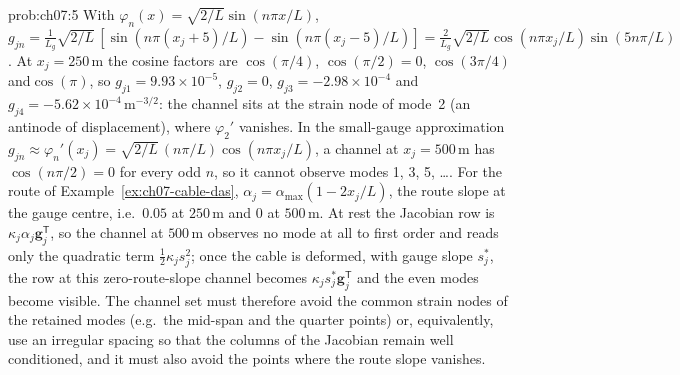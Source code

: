 \documentclass[graybox,envcountchap]{style/SNmono}
\providecommand{\DIFadd}[1]{{\protect\color{blue} #1}} %
\providecommand{\DIFaddbegin}{} %
\providecommand{\DIFaddend}{} %
\begin{document}
\begin{sol}{prob:ch07:5}
With $\varphi_n(x)=\sqrt{2/L}\sin(n\pi x/L)$, $g_{jn}=\frac{1}{L_g}\sqrt{2/L}\,[\sin(n\pi(x_j+5)/L)-\sin(n\pi(x_j-5)/L)]=\frac{2}{L_g}\sqrt{2/L}\cos(n\pi x_j/L)\sin(5n\pi/L)$. At $x_j=250$\,m the cosine factors are $\cos(\pi/4)$, $\cos(\pi/2)=0$, $\cos(3\pi/4)$ and\DIFaddbegin \allowbreak \DIFaddend $\cos(\pi)$, so $g_{j1}=9.93\times10^{-5}$, $g_{j2}=0$, $g_{j3}=-2.98\times10^{-4}$ and\DIFaddbegin \allowbreak \DIFaddend $g_{j4}=-5.62\times10^{-4}$\,m$^{-3/2}$: the channel sits at the strain node of mode~2 (an antinode of displacement), where $\varphi_2'$ vanishes. In the small-gauge approximation $g_{jn}\approx\varphi_n'(x_j)=\sqrt{2/L}\,(n\pi/L)\cos(n\pi x_j/L)$, a channel at $x_j=500$\,m has $\cos(n\pi/2)=0$ for every odd $n$, so it cannot observe modes 1, 3, 5, \ldots. For the route of Example~\ref{ex:ch07-cable-das}, $\alpha_j=\alpha_{\max}(1-2x_j/L)$, the route slope at the gauge centre, i.e.\ $0.05$ at $250$\,m and $0$ at $500$\,m. At rest the Jacobian row is $\kappa_j\alpha_j\mathbf{g}_j^{\mathsf T}$, so the channel at $500$\,m observes no mode at all to first order and reads only the quadratic term $\tfrac12\kappa_js_j^{2}$; once the cable is deformed, with gauge slope $s_j^{\ast}$, the row \DIFaddbegin \DIFadd{at this zero-route-slope channel }\DIFaddend becomes $\kappa_js_j^{\ast}\mathbf{g}_j^{\mathsf T}$ and the even modes become visible. The channel set must therefore avoid the common strain nodes of the retained modes (e.g.\ the mid-span and the quarter points) or, equivalently, use an irregular spacing so that the columns of the Jacobian remain well conditioned, and it must also avoid the points where the route slope vanishes.
\end{sol}
\end{document}
